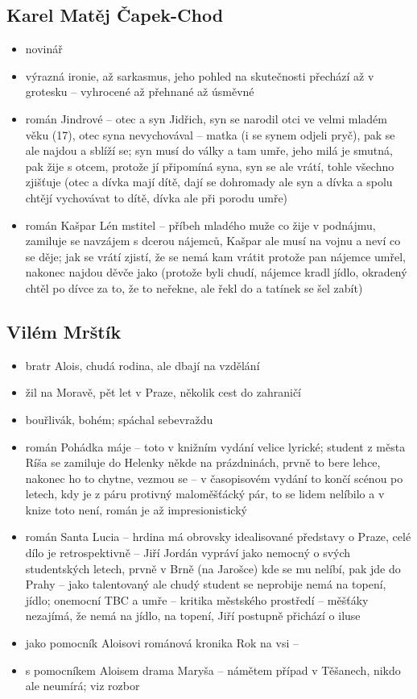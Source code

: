 \documentclass{article}
\begin{document}
\subsection{Karel Matěj Čapek-Chod}
\begin{itemize}
  \item novinář
  \item výrazná ironie, až sarkasmus, jeho pohled na skutečnosti přechází až v grotesku -- vyhrocené až přehnané až úsměvné
  \item román Jindrové -- otec a syn Jidřich, syn se narodil otci ve velmi mladém věku (17), otec syna nevychovával -- matka (i se synem odjeli pryč), pak se ale najdou a sblíží se; syn musí do války a tam umře, jeho milá je smutná, pak žije s otcem, protože jí připomíná syna, syn se ale vrátí, tohle všechno zjišťuje (otec a dívka mají dítě, dají se dohromady ale syn a dívka a spolu chtějí vychovávat to dítě, dívka ale při porodu umře)
  \item román Kašpar Lén mstitel -- příbeh mladého muže co žije v podnájmu, zamiluje se navzájem s dcerou nájemců, Kašpar ale musí na vojnu a neví co se děje; jak se vrátí zjistí, že se nemá kam vrátit protože pan nájemce umřel, nakonec najdou děvče jako  (protože byli chudí, nájemce kradl jídlo, okradený chtěl po dívce  za to, že to neřekne, ale řekl do a tatínek se šel zabít)
\end{itemize}

\subsection{Vilém Mrštík}
\begin{itemize}
  \item bratr Alois, chudá rodina, ale dbají na vzdělání
  \item žil na Moravě, pět let v Praze, několik cest do zahraničí
  \item bouřlivák, bohém; spáchal sebevraždu
  \item román Pohádka máje -- toto v knižním vydání velice lyrické; student z města Ríša se zamiluje do Helenky někde na prázdninách, prvně to bere lehce, nakonec ho to chytne, vezmou se -- v časopisovém vydání to končí scénou po letech, kdy je z páru protivný maloměšťácký pár, to se lidem nelíbilo a v knize toto není, román je až impresionistický
  \item román Santa Lucia -- hrdina má obrovsky idealisované představy o Praze, celé dílo je retrospektivně -- Jiří Jordán vypráví jako nemocný o svých studentských letech, prvně v Brně (na Jarošce) kde se mu nelíbí, pak jde do Prahy -- jako talentovaný ale chudý student se neprobije nemá na topení, jídlo; onemocní TBC a umře -- kritika městského prostředí -- měšťáky nezajímá, že nemá na jídlo, na topení, Jiří postupně přichází o iluse
  \item jako pomocník Aloisovi románová kronika Rok na vsi --
  \item s pomocníkem Aloisem drama Maryša -- námětem případ v Těšanech, nikdo ale neumírá; viz rozbor
\end{itemize}
\end{document}

